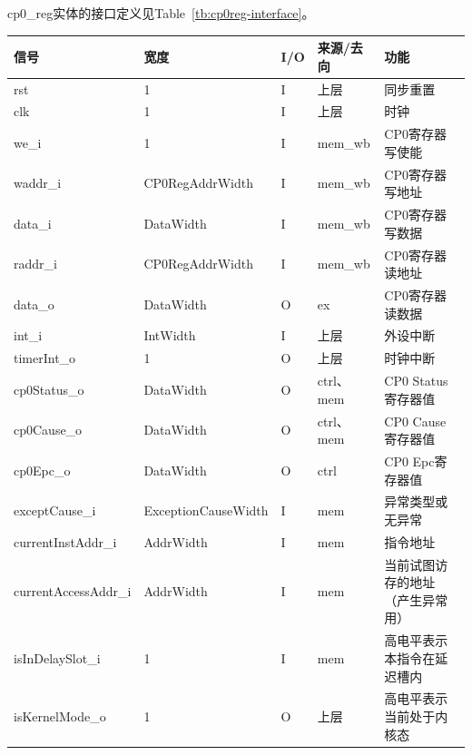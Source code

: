 \documentclass{article}
\begin{document}
\begin{spacing}{1.4}
cp0\_reg实体的接口定义见Table~\ref{tb:cp0reg-interface}。
\begin{longtable}{l|l|l|l|p{5cm}}
\hline
\textbf{信号}&\textbf{宽度}&\textbf{I/O}&\textbf{来源/去向}&\textbf{功能} \\
\hline \endhead rst            & 1                      & I     & 上层          & 同步重置 \\
\hline clk                     & 1                      & I     & 上层          & 时钟 \\
\hline we\_i                   & 1                      & I     & mem\_wb       & CP0寄存器写使能 \\
\hline waddr\_i                & CP0RegAddrWidth        & I     & mem\_wb       & CP0寄存器写地址 \\
\hline data\_i                 & DataWidth              & I     & mem\_wb       & CP0寄存器写数据 \\
\hline raddr\_i                & CP0RegAddrWidth        & I     & mem\_wb       & CP0寄存器读地址 \\
\hline data\_o                 & DataWidth              & O     & ex            & CP0寄存器读数据 \\
\hline int\_i                  & IntWidth               & I     & 上层          & 外设中断 \\
\hline timerInt\_o             & 1                      & O     & 上层          & 时钟中断 \\
\hline cp0Status\_o            & DataWidth              & O     & ctrl、mem     & CP0 Status寄存器值 \\
\hline cp0Cause\_o             & DataWidth              & O     & ctrl、mem     & CP0 Cause寄存器值 \\
\hline cp0Epc\_o               & DataWidth              & O     & ctrl          & CP0 Epc寄存器值 \\
\hline exceptCause\_i          & ExceptionCauseWidth    & I     & mem           & 异常类型或无异常 \\
\hline currentInstAddr\_i      & AddrWidth              & I     & mem           & 指令地址 \\
\hline currentAccessAddr\_i    & AddrWidth              & I     & mem           & 当前试图访存的地址（产生异常用）\\
\hline isInDelaySlot\_i        & 1                      & I     & mem           & 高电平表示本指令在延迟槽内 \\
\hline isKernelMode\_o         & 1                      & O     & 上层          & 高电平表示当前处于内核态 \\

\end{longtable}
\end{spacing}
\end{document}
